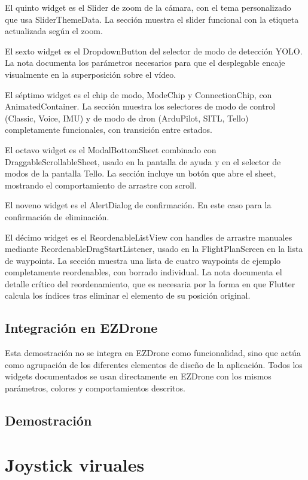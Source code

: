 El quinto widget es el Slider de zoom de la cámara, con el tema personalizado que usa SliderThemeData. La sección muestra el slider funcional con la etiqueta actualizada según el zoom.

El sexto widget es el DropdownButton del selector de modo de detección YOLO. La nota documenta los parámetros necesarios para que el desplegable encaje visualmente en la superposición sobre el vídeo.

El séptimo widget es el chip de modo, ModeChip y ConnectionChip, con AnimatedContainer. La sección muestra los selectores de modo de control (Classic, Voice, IMU) y de modo de dron (ArduPilot, SITL, Tello) completamente funcionales, con transición entre estados.

El octavo widget es el ModalBottomSheet combinado con DraggableScrollableSheet, usado en la pantalla de ayuda y en el selector de modos de la pantalla Tello. La sección incluye un botón que abre el sheet, mostrando el comportamiento de arrastre con scroll.

El noveno widget es el AlertDialog de confirmación. En este caso para la confirmación de eliminación.

El décimo widget es el ReordenableListView con handles de arrastre manuales mediante ReordenableDragStartListener, usado en la FlightPlanScreen en la lista de waypoints. La sección muestra una lista de cuatro waypoints de ejemplo completamente reordenables, con borrado individual. La nota documenta el detalle crítico del reordenamiento, que es necesaria por la forma en que Flutter calcula los índices tras eliminar el elemento de su posición original.

\subsection{Integración en EZDrone}
Esta demostración no se integra en EZDrone como funcionalidad, sino que actúa como agrupación de los diferentes elementos de diseño de la aplicación. Todos los widgets documentados se usan directamente en EZDrone con los mismos parámetros, colores y comportamientos descritos.

\subsection{Demostración}

\section{Joystick viruales}

